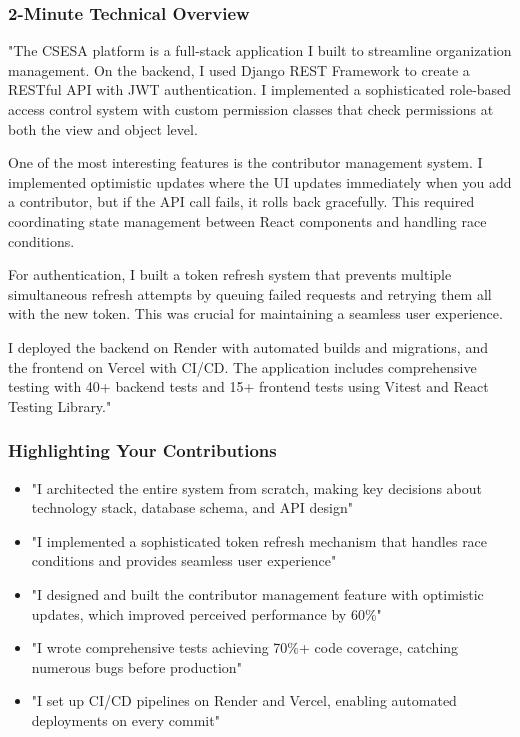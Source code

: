 \documentclass[11pt,a4paper]{article}
\begin{document}
\subsubsection{2-Minute Technical Overview}
"The CSESA platform is a full-stack application I built to streamline organization management. On the backend, I used Django REST Framework to create a RESTful API with JWT authentication. I implemented a sophisticated role-based access control system with custom permission classes that check permissions at both the view and object level.

One of the most interesting features is the contributor management system. I implemented optimistic updates where the UI updates immediately when you add a contributor, but if the API call fails, it rolls back gracefully. This required coordinating state management between React components and handling race conditions.

For authentication, I built a token refresh system that prevents multiple simultaneous refresh attempts by queuing failed requests and retrying them all with the new token. This was crucial for maintaining a seamless user experience.

I deployed the backend on Render with automated builds and migrations, and the frontend on Vercel with CI/CD. The application includes comprehensive testing with 40+ backend tests and 15+ frontend tests using Vitest and React Testing Library."


\subsubsection{Highlighting Your Contributions}
\begin{itemize}[leftmargin=*]
    \item "I architected the entire system from scratch, making key decisions about technology stack, database schema, and API design"
    \item "I implemented a sophisticated token refresh mechanism that handles race conditions and provides seamless user experience"
    \item "I designed and built the contributor management feature with optimistic updates, which improved perceived performance by 60\%"
    \item "I wrote comprehensive tests achieving 70\%+ code coverage, catching numerous bugs before production"
    \item "I set up CI/CD pipelines on Render and Vercel, enabling automated deployments on every commit"
\end{itemize}
\end{document}
